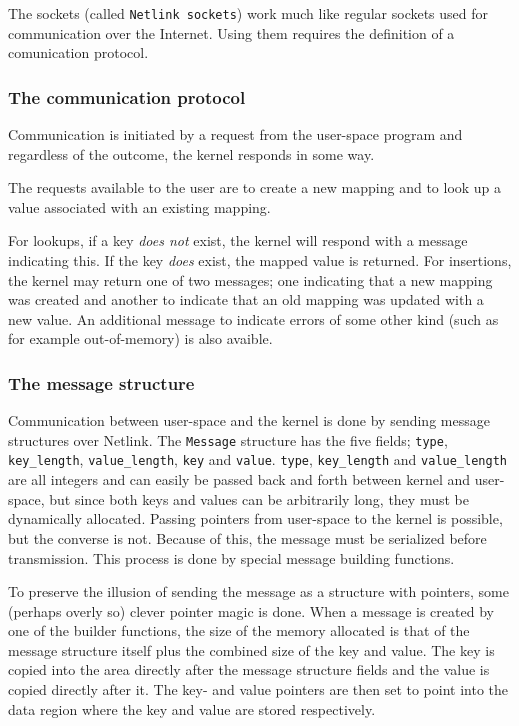 \documentclass[final,a4paper]{article}
\begin{document}
The sockets (called \texttt{Netlink sockets}) work much like regular sockets
used for communication over the Internet. Using them requires the definition
of a comunication protocol.

\subsubsection*{The communication protocol}
Communication is initiated by a request from the user-space program and
regardless of the outcome, the kernel responds in some way.

The requests available to the user are to create a new mapping and to look up
a value associated with an existing mapping.

For lookups, if a key \emph{does not} exist, the kernel will respond with a
message indicating this. If the key \emph{does} exist, the mapped value is
returned. For insertions, the kernel may return one of two messages; one
indicating that a new mapping was created and another to indicate that an old
mapping was updated with a new value. An additional message to indicate errors
of some other kind (such as for example out-of-memory) is also avaible.

\subsubsection*{The message structure}
Communication between user-space and the kernel is done by sending message
structures over Netlink. The \texttt{Message} structure has the five fields;
\texttt{type}, \texttt{key\_length}, \texttt{value\_length}, \texttt{key} and
\texttt{value}. \texttt{type}, \texttt{key\_length} and \texttt{value\_length}
are all integers and can easily be passed back and forth between kernel and
user-space, but since both keys and values can be arbitrarily long, they must
be dynamically allocated. Passing pointers from user-space to the kernel is
possible, but the converse is not. Because of this, the message must be
serialized before transmission. This process is done by special message building
functions.

To preserve the illusion of sending the message as a structure with pointers,
some (perhaps overly so) clever pointer magic is done. When a message is
created by one of the builder functions, the size of the memory allocated is
that of the message structure itself plus the combined size of the key and
value. The key is copied into the area directly after the message structure
fields and the value is copied directly after it. The key- and value pointers
are then set to point into the data region where the key and value are stored
respectively.
\end{document}
